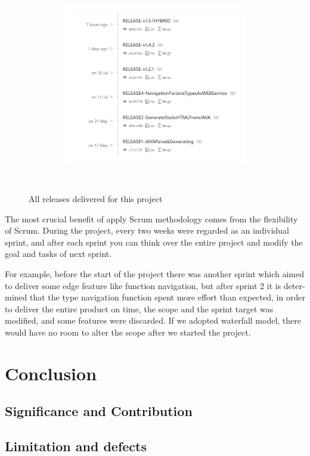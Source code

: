 \documentclass[runningheads]{llncs}
\begin{document}
\begin{figure}[H]
    \centering
    \includegraphics[width=8cm]{pic/github-release.png}
    \caption{All releases delivered for this project\cite{ojn-releases}}
    \label{All releases delivered for this project}
\end{figure}

The most crucial benefit of apply Scrum methodology comes from the flexibility of Scrum. During the project, every two weeks were regarded as an individual sprint, and after each sprint you can think over the entire project and modify the goal and tasks of next sprint. 

For example, before the start of the project there was another sprint which aimed to deliver some edge feature like function navigation, but after sprint 2 it is deter-mined that the type navigation function spent more effort than expected, in order to deliver the entire product on time, the scope and the sprint target was modified, and some features were discarded. If we adopted waterfall model, there would have no room to alter the scope after we started the project.
	
\section{Conclusion}

\subsection{Significance and Contribution}

\subsection{Limitation and defects}
\end{document}
